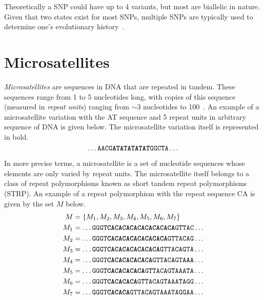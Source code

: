 Theoretically a SNP could have up to 4 variants, but most are biallelic in nature.
Given that two states exist for most SNPs, multiple SNPs are typically used to determine one's evolutionary
history~\cite{jehanSingleNucleotidePolymorphism2006}.

\section{Microsatellites}\label{sec:microsatellites}
\emph{Microsatellites} are sequences in DNA that are repeated in tandem.
These sequences range from 1 to 5 nucleotides long, with copies of this sequence (measured in
\emph{repeat units}) ranging from $\sim 3$ nucleotides to
100~\cite{roseThresholdSizeMicrosatellite1998,fanBriefReviewShort2007}.
An example of a microsatellite variation with the AT sequence and 5 repeat units in arbitrary
sequence of DNA is given below.
The microsatellite variation itself is represented in bold.
\begin{equation*}
     \ldots \texttt{AACG\textbf{ATATATATAT}GGCTA} \ldots
\end{equation*}

In more precise terms, a microsatellite is a set of nucleotide sequences whose elements are only varied by repeat units.
The microsatellite itself belongs to a class of repeat polymorphisms known as short tandem repeat polymorphisms (STRP).
An example of a repeat polymorphism with the repeat sequence CA is given by the set $M$ below.
\begin{align*}
    M &= \{ M_1, M_2, M_3, M_4, M_5, M_6, M_7 \} \\
    M_1 &= \ldots \texttt{GGGT\textbf{CACACACACACACACACA}GTTAC} \ldots \\
    M_2 &= \ldots \texttt{GGGT\textbf{CACACACACACACACA}GTTACAG} \ldots \\
    M_3 &= \ldots \texttt{GGGT\textbf{CACACACACACACA}GTTACAGTA} \ldots \\
    M_4 &= \ldots \texttt{GGGT\textbf{CACACACACACA}GTTACAGTAAA} \ldots \\
    M_5 &= \ldots \texttt{GGGT\textbf{CACACACACA}GTTACAGTAAATA} \ldots \\
    M_6 &= \ldots \texttt{GGGT\textbf{CACACACA}GTTACAGTAAATAGG} \ldots \\
    M_7 &= \ldots \texttt{GGGT\textbf{CACACA}GTTACAGTAAATAGGAA} \ldots
\end{align*}

